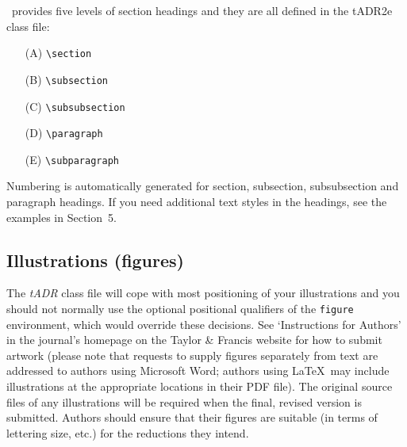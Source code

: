 \documentclass{tADR2e}
\begin{document}
\LaTeXe\ provides five levels of section headings and they are all defined in the tADR2e class file:
\begin{enumerate}
   \item[(A)] \verb"\section"
   \item[(B)] \verb"\subsection"
   \item[(C)] \verb"\subsubsection"
   \item[(D)] \verb"\paragraph"
   \item[(E)] \verb"\subparagraph"
\end{enumerate}
Numbering is automatically generated for section, subsection, subsubsection and paragraph headings.  If you need
additional text styles in the headings, see the examples in Section~5.


\subsection{Illustrations (figures)}

The {\it tADR} class file will cope with most positioning of your illustrations and you should not normally use the
optional positional qualifiers of the {\tt figure} environment, which would override these decisions. See
`Instructions for Authors' in the journal's homepage on the Taylor \& Francis website for how to submit artwork (please note that requests to supply figures separately from text are addressed to authors using Microsoft Word; authors using \LaTeX\ may include illustrations at the appropriate locations in their PDF file). The original source files of any illustrations will be required when the final, revised version is submitted. Authors should ensure that their figures are suitable (in terms of lettering size, etc.) for the reductions they intend.
\end{document}
